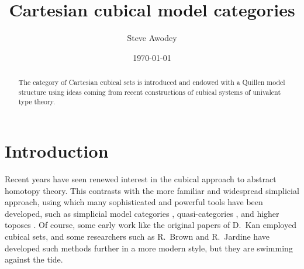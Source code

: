 \documentclass[11pt,reqno]{amsart}
\theoremstyle{remark}
\theoremstyle{definition}
\begin{document}

\title{Cartesian cubical model categories}
\author{Steve Awodey}
\date{\today}


\begin{abstract}
\noindent The category of Cartesian cubical sets is introduced and endowed with a Quillen model structure
using ideas coming from recent constructions of cubical systems of univalent type theory.
\end{abstract}

\maketitle

\setcounter{tocdepth}{1}
\tableofcontents


\section*{Introduction}

Recent years have seen renewed interest in the cubical approach to abstract homotopy theory.  This contrasts with the more familiar and widespread simplicial approach, using which many sophisticated and powerful tools have been developed, such as simplicial model categories \cite{DwyerKan:1980sl}, quasi-categories \cite{Joyal:2008tq}, and higher toposes \cite{Lurie:2009ht}.  Of course, some early work like the original papers of D.\ Kan \cite{Kan:55,Kan:56} employed cubical sets, and some researchers such as R.\ Brown \cite{BROWN2018459} and R.\ Jardine \cite{Jardine:cubical} have developed such methods further in a more modern style, but they are swimming against the tide.  
\end{document}
